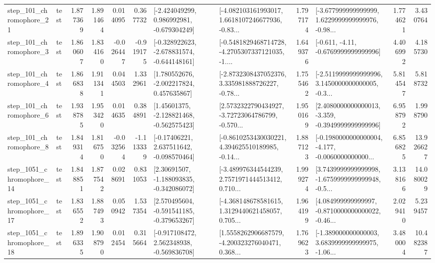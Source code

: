 \begin{tabular}{llrrrrllrlrr}
  step\_101\_chromophore\_21 &      test &      1.877369 &    1.891464 &      0.014095 &  0.367732 &   [-2.424049299, 0.986992981, -0.679304249] &  [-4.082103161993017, 1.6618107246677936, -0.83... &       1.797174 &  [-3.677999999999999, 1.6229999999999976, -0.98... &            1.774621 &          3.430764 \\
   step\_101\_chromophore\_3 &      test &      1.860607 &    1.834160 &     -0.026447 & -0.919175 &  [-0.328922623, -2.678831574, -0.644148161] &  [-0.5481829468714728, -4.2705307337121035, -1.... &       1.649376 &               [-0.611, -4.11, -0.6769999999999996] &            4.406992 &          4.185730 \\
   step\_101\_chromophore\_4 &      test &      1.866838 &    1.911341 &      0.044503 &  1.332961 &    [1.780552676, -2.002217824, 0.457635867] &  [-2.8732308437052376, 3.335981888726227, -0.78... &       1.755462 &  [-2.5119999999999996, 3.1450000000000005, -0.3... &            5.814547 &          5.818732 \\
   step\_101\_chromophore\_6 &      test &      1.938785 &    1.953420 &      0.014635 &  0.384891 &    [1.45601375, -2.128821468, -0.562575423] &  [2.5732322790434927, -3.72723064786799, -0.570... &       1.950169 &  [2.4080000000000013, -3.359, -0.3949999999999996] &            6.958792 &          1.998790 \\
   step\_101\_chromophore\_8 &      test &      1.849314 &    1.816750 &     -0.032564 & -1.113339 &    [-0.17406221, 2.637511642, -0.098570464] &  [-0.8610253430030221, 4.394625510189985, -0.14... &       1.887123 &  [-0.1980000000000004, -4.177, -0.0060000000000... &            6.856825 &         13.926627 \\
 step\_1051\_chromophore\_14 &      test &      1.848851 &    1.877542 &      0.028691 &  0.831053 &    [2.30691507, -1.188093835, -0.342086072] &  [-3.489976344544239, 2.7571971444513412, 0.710... &       1.999274 &  [3.7439999999999998, -1.6759999999999948, -0.5... &            3.138166 &         14.080029 \\
 step\_1051\_chromophore\_17 &      test &      1.836552 &    1.887493 &      0.050942 &  1.537354 &   [2.570495604, -0.591541185, -0.379653267] &  [-4.368148678581615, 1.3129440621458057, 0.705... &       1.964199 &  [4.084999999999997, -0.8710000000000022, -0.46... &            2.029410 &          5.239457 \\
 step\_1051\_chromophore\_18 &      test &      1.896335 &    1.908790 &      0.012454 &  0.315664 &   [-0.917108472, 2.562348938, -0.569836708] &  [1.5558262906687579, -4.200323276040471, 0.368... &       1.769623 &  [-1.389000000000003, 3.6839999999999975, -1.06... &            3.480004 &         10.482387 \\

\end{tabular}

